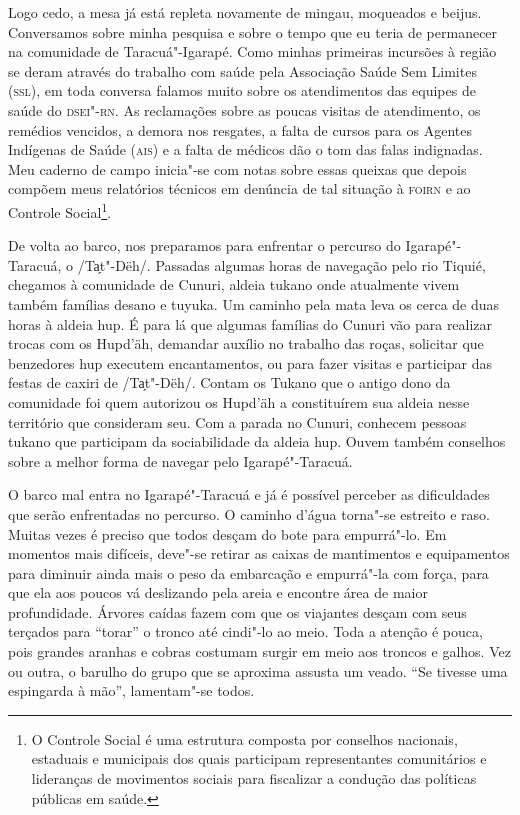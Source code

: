 Logo cedo, a mesa já está repleta novamente de mingau, moqueados e
beijus. Conversamos sobre minha pesquisa e sobre o tempo que eu teria de
permanecer na comunidade de Taracuá"-Igarapé. Como minhas primeiras
incursões à região se deram através do trabalho com saúde pela
Associação Saúde Sem Limites (\textsc{ssl}), em toda conversa falamos muito sobre
os atendimentos das equipes de saúde do \textsc{dsei}"-\textsc{rn}. As reclamações sobre as
poucas visitas de atendimento, os remédios vencidos, a demora nos
resgates, a falta de cursos para os Agentes Indígenas de Saúde (\textsc{ais}) e a
falta de médicos dão o tom das falas indignadas. Meu caderno de campo
inicia"-se com notas sobre essas queixas que depois compõem meus
relatórios técnicos em denúncia de tal situação à \textsc{foirn} e ao Controle
Social\footnote{O Controle Social é uma estrutura composta por conselhos
  nacionais, estaduais e municipais dos quais participam representantes
  comunitários e lideranças de movimentos sociais para fiscalizar a
  condução das políticas públicas em saúde.}.

De volta ao barco, nos preparamos para enfrentar o percurso do
Igarapé"-Taracuá, o /Ta̗t"-Dëh/. Passadas algumas horas de navegação pelo
rio Tiquié, chegamos à comunidade de Cunuri, aldeia tukano onde
atualmente vivem também famílias desano e tuyuka. Um caminho pela mata
leva os cerca de duas horas à aldeia hup. É para lá que algumas famílias
do Cunuri vão para realizar trocas com os Hupd'äh, demandar auxílio no
trabalho das roças, solicitar que benzedores hup executem encantamentos,
ou para fazer visitas e participar das festas de caxiri de /Ta̗t"-Dëh/.
Contam os Tukano que o antigo dono da comunidade foi quem autorizou os
Hupd'äh a constituírem sua aldeia nesse território que consideram seu.
Com a parada no Cunuri, conhecem pessoas tukano que participam da
sociabilidade da aldeia hup. Ouvem também conselhos sobre a melhor forma
de navegar pelo Igarapé"-Taracuá.

O barco mal entra no Igarapé"-Taracuá e já é possível perceber as
dificuldades que serão enfrentadas no percurso. O caminho d'água
torna"-se estreito e raso. Muitas vezes é preciso que todos desçam do
bote para empurrá"-lo. Em momentos mais difíceis, deve"-se retirar as
caixas de mantimentos e equipamentos para diminuir ainda mais o peso da
embarcação e empurrá"-la com força, para que ela aos poucos vá deslizando
pela areia e encontre área de maior profundidade. Árvores caídas fazem
com que os viajantes desçam com seus terçados para ``torar'' o tronco
até cindi"-lo ao meio. Toda a atenção é pouca, pois grandes aranhas e
cobras costumam surgir em meio aos troncos e galhos. Vez ou outra, o
barulho do grupo que se aproxima assusta um veado. ``Se tivesse uma
espingarda à mão'', lamentam"-se todos.


